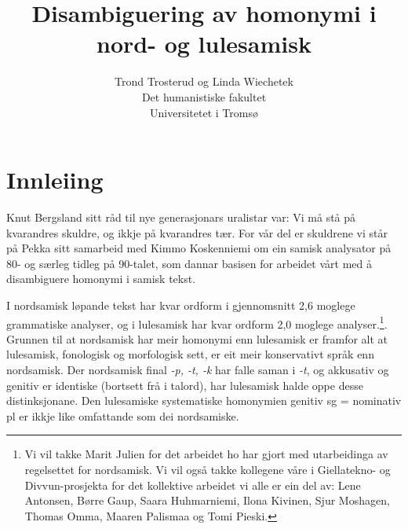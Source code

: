 \documentclass[a4paper,norsk]{article}
\begin{document}
\title{Disambiguering av homonymi i nord- og lulesamisk}

\author{Trond Trosterud og Linda Wiechetek\\
Det humanistiske fakultet\\
Universitetet i Tromsø}

\maketitle



% 

\section{Innleiing} 




Knut Bergsland sitt råd til nye generasjonars uralistar var: Vi må stå på kvarandres skuldre, og ikkje på kvarandres tær. For vår del er skuldrene vi står på Pekka sitt samarbeid med Kimmo Koskenniemi om ein samisk analysator på 80- og særleg tidleg på 90-talet, som dannar basisen for arbeidet vårt med å disambiguere homonymi i samisk tekst.  

I nordsamisk løpande tekst har kvar ordform i gjennomsnitt 2,6 moglege grammatiske analyser, og i lulesamisk har kvar ordform 2,0 moglege analyser.\footnote{Vi vil takke Marit Julien for det arbeidet ho har gjort med utarbeidinga av regelsettet for nordsamisk. Vi vil også takke kollegene våre i Giellatekno- og Divvun-prosjekta for det kollektive arbeidet vi alle er ein del av: Lene Antonsen, Børre Gaup, Saara Huhmarniemi, Ilona Kivinen, Sjur Moshagen, Thomas Omma, Maaren Palismaa og Tomi Pieski. }. Grunnen til at nordsamisk har meir homonymi enn lulesamisk er framfor alt at lulesamisk, fonologisk og morfologisk sett, er eit meir konservativt språk enn nordsamisk. Der nordsamisk final \emph{-p, -t, -k} har falle saman i \emph{-t}, og akkusativ og genitiv er identiske (bortsett frå i talord), har lulesamisk halde oppe desse distinksjonane. Den lulesamiske systematiske homonymien genitiv sg = nominativ pl er ikkje like omfattande som dei nordsamiske. %
\end{document}
